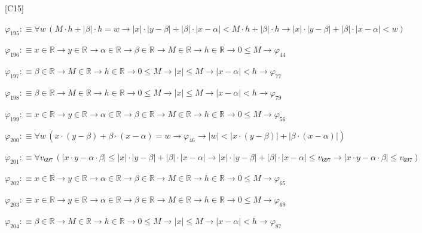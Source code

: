 \begin{fullproof}{[C15]}
\begin{abbrevlist}
\item $\varphi_{195} :\equiv \forall w\,(M \cdot h + \lvert \beta \rvert \cdot h = w \to \lvert x \rvert \cdot \lvert y - \beta \rvert + \lvert \beta \rvert \cdot \lvert x - \alpha \rvert < M \cdot h + \lvert \beta \rvert \cdot h \to \lvert x \rvert \cdot \lvert y - \beta \rvert + \lvert \beta \rvert \cdot \lvert x - \alpha \rvert < w)$
\item $\varphi_{196} :\equiv x \in \mathbb{R} \to y \in \mathbb{R} \to \alpha \in \mathbb{R} \to \beta \in \mathbb{R} \to M \in \mathbb{R} \to h \in \mathbb{R} \to 0 \leq M \to \varphi_{44}$
\item $\varphi_{197} :\equiv \beta \in \mathbb{R} \to M \in \mathbb{R} \to h \in \mathbb{R} \to 0 \leq M \to \lvert x \rvert \leq M \to \lvert x - \alpha \rvert < h \to \varphi_{77}$
\item $\varphi_{198} :\equiv \beta \in \mathbb{R} \to M \in \mathbb{R} \to h \in \mathbb{R} \to 0 \leq M \to \lvert x \rvert \leq M \to \lvert x - \alpha \rvert < h \to \varphi_{79}$
\item $\varphi_{199} :\equiv x \in \mathbb{R} \to y \in \mathbb{R} \to \alpha \in \mathbb{R} \to \beta \in \mathbb{R} \to M \in \mathbb{R} \to h \in \mathbb{R} \to 0 \leq M \to \varphi_{56}$
\item $\varphi_{200} :\equiv \forall w\,(x \cdot (y - \beta) + \beta \cdot (x - \alpha) = w \to \varphi_{46} \to \lvert w \rvert < \lvert x \cdot (y - \beta) \rvert + \lvert \beta \cdot (x - \alpha) \rvert)$
\item $\varphi_{201} :\equiv \forall v_{697}\,(\lvert x \cdot y - \alpha \cdot \beta \rvert \leq \lvert x \rvert \cdot \lvert y - \beta \rvert + \lvert \beta \rvert \cdot \lvert x - \alpha \rvert \to \lvert x \rvert \cdot \lvert y - \beta \rvert + \lvert \beta \rvert \cdot \lvert x - \alpha \rvert \leq v_{697} \to \lvert x \cdot y - \alpha \cdot \beta \rvert \leq v_{697})$
\item $\varphi_{202} :\equiv x \in \mathbb{R} \to y \in \mathbb{R} \to \alpha \in \mathbb{R} \to \beta \in \mathbb{R} \to M \in \mathbb{R} \to h \in \mathbb{R} \to 0 \leq M \to \varphi_{65}$
\item $\varphi_{203} :\equiv x \in \mathbb{R} \to y \in \mathbb{R} \to \alpha \in \mathbb{R} \to \beta \in \mathbb{R} \to M \in \mathbb{R} \to h \in \mathbb{R} \to 0 \leq M \to \varphi_{69}$
\item $\varphi_{204} :\equiv \beta \in \mathbb{R} \to M \in \mathbb{R} \to h \in \mathbb{R} \to 0 \leq M \to \lvert x \rvert \leq M \to \lvert x - \alpha \rvert < h \to \varphi_{87}$

\end{abbrevlist}
\end{fullproof}
